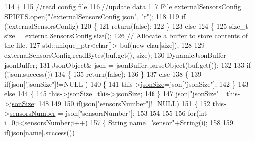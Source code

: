 \begin{DoxyCode}
114 \{
115     \textcolor{comment}{//read config file}
116     \textcolor{comment}{//update data}
117     File externalSensorsConfig = SPIFFS.open(\textcolor{stringliteral}{"/externalSensorsConfig.json"}, \textcolor{stringliteral}{"r"});
118 
119     \textcolor{keywordflow}{if} (!externalSensorsConfig) 
120     \{
121         \textcolor{keywordflow}{return}(\textcolor{keyword}{false});
122     \}
123     \textcolor{keywordflow}{else}
124     \{
125         \textcolor{keywordtype}{size\_t} size = externalSensorsConfig.size();
126         \textcolor{comment}{// Allocate a buffer to store contents of the file.}
127         std::unique\_ptr<char[]> buf(\textcolor{keyword}{new} \textcolor{keywordtype}{char}[size]);
128 
129         externalSensorsConfig.readBytes(buf.get(), size);
130         DynamicJsonBuffer jsonBuffer;
131         JsonObject& json = jsonBuffer.parseObject(buf.get());
132 
133         \textcolor{keywordflow}{if} (!json.success()) 
134         \{
135               \textcolor{keywordflow}{return}(\textcolor{keyword}{false});
136         \} 
137         \textcolor{keywordflow}{else}
138         \{   
139             \textcolor{keywordflow}{if}(json[\textcolor{stringliteral}{"jsonSize"}]!=NULL )
140             \{           
141                 this->\hyperlink{classExternalSensors_acacea86d74d967b57fcff282d26cff57}{jsonSize}=json[\textcolor{stringliteral}{"jsonSize"}];
142             \}
143             \textcolor{keywordflow}{else}
144             \{
145                 this->\hyperlink{classExternalSensors_acacea86d74d967b57fcff282d26cff57}{jsonSize}=this->\hyperlink{classExternalSensors_acacea86d74d967b57fcff282d26cff57}{jsonSize};
146             \}
147             json[\textcolor{stringliteral}{"jsonSize"}]=this->\hyperlink{classExternalSensors_acacea86d74d967b57fcff282d26cff57}{jsonSize};            
148 
149             
150             \textcolor{keywordflow}{if}(json[\textcolor{stringliteral}{"sensorsNumber"}]!=NULL)
151             \{
152                 this->\hyperlink{classExternalSensors_a58e4fbf9adeae787d92be5fa33043b5d}{sensorsNumber} = json[\textcolor{stringliteral}{"sensorsNumber"}];
153                 
154                 
155 
156                 \textcolor{keywordflow}{for}(\textcolor{keywordtype}{int} i=0;i<\hyperlink{classExternalSensors_a58e4fbf9adeae787d92be5fa33043b5d}{sensorsNumber};i++)
157                 \{   String name=\textcolor{stringliteral}{"sensor"}+String(i);
158                     
159                     \textcolor{keywordflow}{if}(json[name].success())

\end{DoxyCode}
